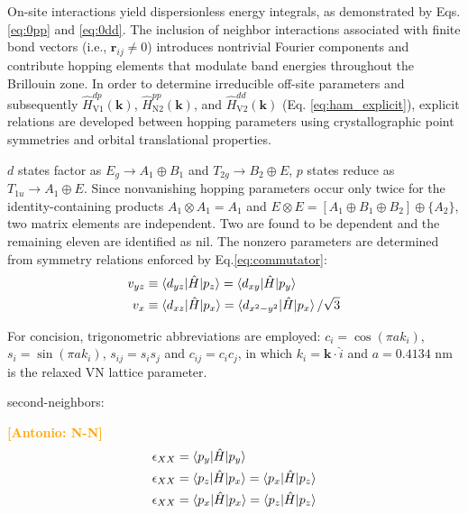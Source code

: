 \documentclass[twocolumn,showpacs,preprintnumbers,superscriptaddress,prb,floatfix,aps,10pt]{revtex4-1}
\newcommand{\abmei}[1]{\textcolor{orange}{ \bf [Antonio: #1] }}
\renewcommand{\vec}[1]{\ensuremath{\mathbf{#1}}}
\newcommand*{\ham}{\hat{H}}
\begin{document}
On-site interactions yield dispersionless energy integrals, as demonstrated by Eqs. \ref{eq:0pp} and \ref{eq:0dd}. The inclusion of neighbor interactions associated with finite bond vectors (i.e., $\vec{r}_{ij} \neq 0$) introduces nontrivial Fourier components and contribute hopping elements that modulate band energies throughout the Brillouin zone. In order to determine irreducible off-site parameters and subsequently $\ham_{\textrm{V}1}^{dp}(\vec{k})$, $\ham_{\textrm{N}2}^{pp}(\vec{k})$, and $\ham_{\textrm{V}2}^{dd}(\vec{k})$ (Eq. \ref{eq:ham_explicit}), explicit relations are developed between hopping parameters using crystallographic point symmetries and orbital translational properties. 








$d$ states factor as $E_g \rightarrow A_1 \oplus B_1$ and $T_{2g} \rightarrow B_2 \oplus E$, $p$ states reduce as $T_{1u} \rightarrow A_1 \oplus E$. Since nonvanishing hopping parameters occur only twice for the identity-containing products $A_1 \otimes A_1 = A_1$ and $E \otimes E = [ A_1 \oplus B_1 \oplus B_2 ] \oplus \{ A_2 \}$, two matrix elements are independent. Two are found to be dependent and the remaining eleven are identified as nil. The nonzero parameters are determined from symmetry relations enforced by Eq.\ref{eq:commutator}:
%
\begin{align}
v_{yz} &
\equiv \braket{d_{yz} | \ham | p_z} 
= \braket{d_{xy} | \ham | p_y} \\
v_{x} &
\equiv \braket{d_{xz} | \ham | p_x} 
= \braket{d_{x^2-y^2} | \ham | p_x} / \sqrt{3}
\end{align}

%
For concision, trigonometric abbreviations are employed: $c_i = \cos(\pi a k_i)$, $s_i = \sin(\pi a k_i)$, $s_{ij} = s_i s_j$ and $c_{ij} = c_i c_j$, in which $k_i = \vec{k}\cdot\hat{i}$ and $a = 0.4134$ nm is the relaxed VN lattice parameter. 

second-neighbors:

\abmei{N-N}
\begin{align}
\epsilon_{XX} &
= \braket{p_{y} | \ham | p_y } \\
\epsilon_{XX} &
= \braket{p_{z} | \ham | p_x }
= \braket{p_{x} | \ham | p_z } \\
\epsilon_{XX} &
= \braket{p_{x} | \ham | p_x }
= \braket{p_{z} | \ham | p_z } \\
\end{align}
\end{document}

